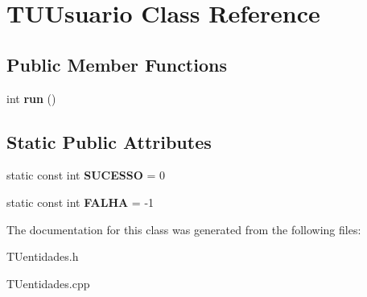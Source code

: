 \hypertarget{classTUUsuario}{}\section{T\+U\+Usuario Class Reference}
\label{classTUUsuario}
\subsection*{Public Member Functions}
\begin{DoxyCompactItemize}
\item 
\mbox{\label{classTUUsuario_af12e1b9020cfb11a1f659373a70268fa}} 
int {\bfseries run} ()
\end{DoxyCompactItemize}
\subsection*{Static Public Attributes}
\begin{DoxyCompactItemize}
\item 
\mbox{\label{classTUUsuario_aa9302e7d6f13452c83f21224fd335e54}} 
static const int {\bfseries S\+U\+C\+E\+S\+SO} = 0
\item 
\mbox{\label{classTUUsuario_af1a7217e0d002f0d0b524c901bb75c98}} 
static const int {\bfseries F\+A\+L\+HA} = -\/1
\end{DoxyCompactItemize}


The documentation for this class was generated from the following files\+:\begin{DoxyCompactItemize}
\item 
T\+Uentidades.\+h\item 
T\+Uentidades.\+cpp\end{DoxyCompactItemize}

